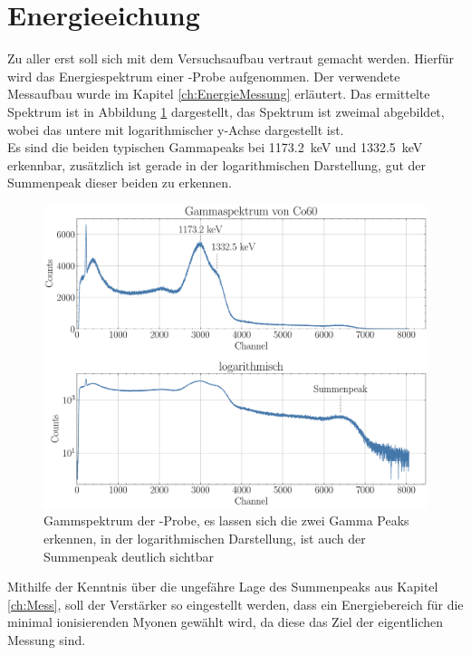 \documentclass[12pt,a4paper,ngerman]{report}
\begin{document}
	\section{Energieeichung}
		Zu aller erst soll sich mit dem Versuchsaufbau vertraut gemacht werden. Hierfür wird das Energiespektrum einer -Probe aufgenommen. Der verwendete Messaufbau wurde im Kapitel \ref{ch:EnergieMessung} erläutert. Das ermittelte Spektrum ist in Abbildung \ref{img:GammaCo60} dargestellt, das Spektrum ist zweimal abgebildet, wobei das untere mit logarithmischer y-Achse dargestellt ist.\\
		Es sind die beiden typischen Gammapeaks bei \SI{1173.2}{\kilo \eV} und \SI{1332.5}{\kilo \eV} erkennbar, zusätzlich ist gerade in der logarithmischen Darstellung, gut der Summenpeak dieser beiden zu erkennen. 
		\begin{figure}[ht]
			\centering
			\includegraphics[width=\textwidth]{Bilder/GammaCo60.pdf}		
			\caption[Gammspektrum der -Probe]{Gammspektrum der -Probe, es lassen sich die zwei Gamma Peaks erkennen, in der logarithmischen Darstellung, ist auch der Summenpeak deutlich sichtbar}
			\label{img:GammaCo60}
		\end{figure}
	Mithilfe der Kenntnis über die ungefähre Lage des Summenpeaks aus Kapitel \ref{ch:Mess}, soll der Verstärker so eingestellt werden, dass ein Energiebereich für die minimal ionisierenden
	Myonen gewählt wird, da diese das Ziel der eigentlichen Messung sind.
\end{document}
